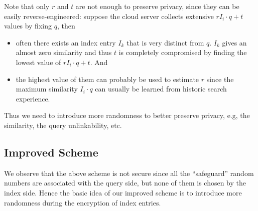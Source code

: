 \documentclass{article}
\begin{document}
Note that only $r$ and $t$ are not enough to preserve privacy, since they can be easily reverse-engineered: suppose the cloud server collects extensive $rI_i\cdot q+t$ values by fixing $q$, then
\begin{itemize}
\item often there exists an index entry $I_k$ that is very distinct from $q$. $I_k$ gives an almost zero similarity and thus $t$ is completely compromised by finding the lowest value of $rI_i\cdot q+t$. And
\item the highest value of them can probably be used to estimate $r$ since the maximum similarity $I_i\cdot q$ can usually be learned from historic search experience. 
\end{itemize}
Thus we need to introduce more randomness to better preserve privacy, e.g, the similarity, the query unlinkability, etc.

\subsection{Improved Scheme}
We observe that the above scheme is not secure since all the ``safeguard'' random numbers are associated with the query side, but none of them is chosen by the index side. Hence the basic idea of our improved scheme is to introduce more randomness during the encryption of index entries.
\end{document}
